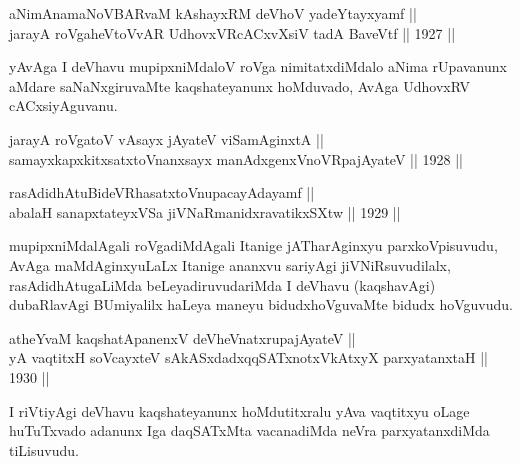 \begin{shl}
aNimAnamaNoVBARvaM kAshayxRM deVhoV yadeYtayxyamf || \\
jarayA roVgaheVtoVvAR UdhovxVRcACxvXsiV tadA BaveVtf \hfill || 1927 ||
  
\end{shl}

\begin{artha}
yAvAga I deVhavu mupipxniMdaloV roVga nimitatxdiMdalo aNima rUpavanunx
aMdare saNaNxgiruvaMte kaqshateyanunx hoMduvado, AvAga UdhovxRV
cACxsiyAguvanu.
\end{artha}


\begin{shl}
jarayA roVgatoV vA\s sayx jAyateV viSamAginxtA || \\
samayxkapxkitxsatxtoV\s nanxsayx manAdxgenxVnoVRpajAyateV \hfill || 1928 ||
 
\end{shl}

\begin{shl}
rasAdidhAtuBideVRhasatxtoV\s nupacayAdayamf || \\
abalaH sanapxtateyxVSa jiVNaRmanidxravatikxSXtw \hfill || 1929 ||
  
\end{shl}

\begin{artha}
mupipxniMdalAgali roVgadiMdAgali Itanige jATharAginxyu
parxkoVpisuvudu, AvAga maMdAginxyuLaLx Itanige ananxvu sariyAgi
jiVNiRsuvudilalx, rasAdidhAtugaLiMda beLeyadiruvudariMda I deVhavu
(kaqshavAgi) dubaRlavAgi BUmiyalilx haLeya maneyu bidudxhoVguvaMte
bidudx hoVguvudu.
\end{artha}


\begin{shl}
atheYvaM kaqshatApanenxV deVheV\s natxrupajAyateV ||  \\
yA vaqtitxH soVcayxteV sAkASxdadxqqSATxnotxVkAtxyX parxyatanxtaH \hfill || 1930 ||
  
\end{shl}

\begin{artha}
I riVtiyAgi deVhavu kaqshateyanunx hoMdutitxralu yAva vaqtitxyu oLage
huTuTxvado adanunx Iga daqSATxMta vacanadiMda neVra parxyatanxdiMda
tiLisuvudu.
\end{artha}

